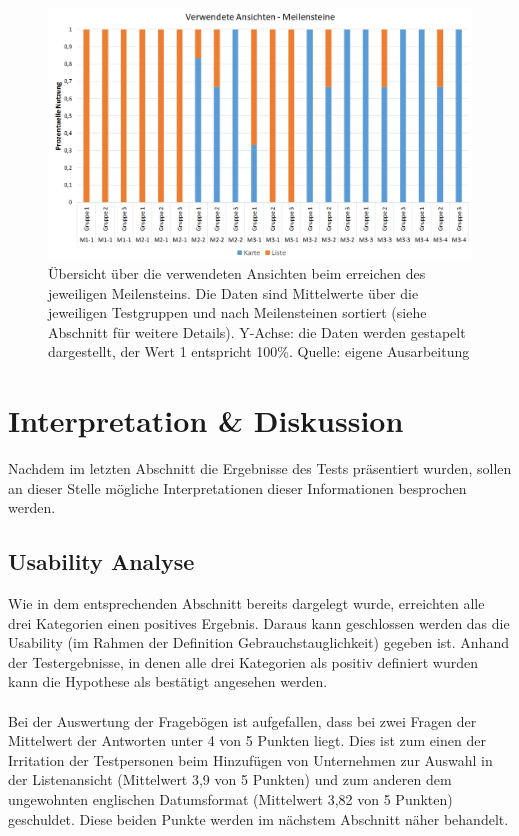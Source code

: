 \documentclass[Bachelorarbeit.tex]{subfiles}
\begin{document}
\begin{figure}[h]
\centering
\includegraphics[width=1\linewidth]{img/Evaluation/Meilenstein}
\caption[Verwendete Ansichten - Meilensteine]{
	Übersicht über die verwendeten Ansichten beim erreichen des jeweiligen Meilensteins. Die Daten sind Mittelwerte über die jeweiligen Testgruppen und nach Meilensteinen sortiert (siehe Abschnitt  für weitere Details). Y-Achse: die Daten werden gestapelt dargestellt, der Wert 1 entspricht 100\%.
	Quelle: eigene Ausarbeitung
	}
\label{fig:Meilenstein}
\end{figure}



\section{Interpretation \& Diskussion}
\label{InterpretationDiskussion}
Nachdem im letzten Abschnitt die Ergebnisse des Tests präsentiert wurden, sollen an dieser Stelle mögliche Interpretationen dieser Informationen besprochen werden.

\subsection{Usability Analyse}
Wie in dem entsprechenden Abschnitt bereits dargelegt wurde, erreichten alle drei Kategorien einen positives Ergebnis. 
Daraus kann geschlossen werden das die Usability (im Rahmen der Definition Gebrauchstauglichkeit) gegeben ist. 
Anhand der Testergebnisse, in denen alle drei Kategorien als positiv definiert wurden kann die Hypothese als bestätigt angesehen werden.  
\\
\\
Bei der Auswertung der Fragebögen ist aufgefallen, dass bei zwei Fragen der Mittelwert der Antworten unter 4 von 5 Punkten liegt. 
Dies ist zum einen der Irritation der Testpersonen beim Hinzufügen von Unternehmen zur Auswahl in der Listenansicht (Mittelwert 3,9 von 5 Punkten) und zum anderen dem ungewohnten englischen Datumsformat (Mittelwert 3,82 von 5 Punkten) geschuldet.
Diese beiden Punkte werden im nächstem Abschnitt näher behandelt.
\end{document}
